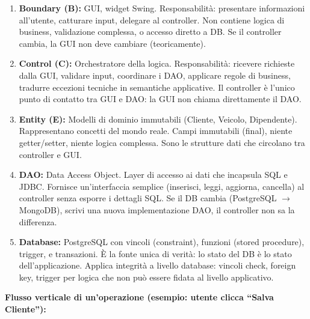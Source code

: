 \documentclass[12pt,a4paper]{article}
\begin{document}
\begin{enumerate}
  \item \textbf{Boundary (B):} GUI, widget Swing. Responsabilità: presentare informazioni all'utente, catturare input, delegare al controller.
    Non contiene logica di business, validazione complessa, o accesso diretto a DB.
    Se il controller cambia, la GUI non deve cambiare (teoricamente).
  
  \item \textbf{Control (C):} Orchestratore della logica. Responsabilità: ricevere richieste dalla GUI, validare input, coordinare i DAO, applicare regole di business, tradurre eccezioni tecniche in semantiche applicative.
    Il controller è l'unico punto di contatto tra GUI e DAO: la GUI non chiama direttamente il DAO.
  
  \item \textbf{Entity (E):} Modelli di dominio immutabili (Cliente, Veicolo, Dipendente).
    Rappresentano concetti del mondo reale. Campi immutabili (final), niente getter/setter, niente logica complessa.
    Sono le strutture dati che circolano tra controller e GUI.
  
  \item \textbf{DAO:} Data Access Object. Layer di accesso ai dati che incapsula SQL e JDBC.
    Fornisce un'interfaccia semplice (inserisci, leggi, aggiorna, cancella) al controller senza esporre i dettagli SQL.
    Se il DB cambia (PostgreSQL $\to$ MongoDB), scrivi una nuova implementazione DAO, il controller non sa la differenza.
  
  \item \textbf{Database:} PostgreSQL con vincoli (constraint), funzioni (stored procedure), trigger, e transazioni.
    È la fonte unica di verità: lo stato del DB è lo stato dell'applicazione.
    Applica integrità a livello database: vincoli check, foreign key, trigger per logica che non può essere fidata al livello applicativo.
\end{enumerate}

\textbf{Flusso verticale di un'operazione (esempio: utente clicca ``Salva Cliente''):}
\end{document}
